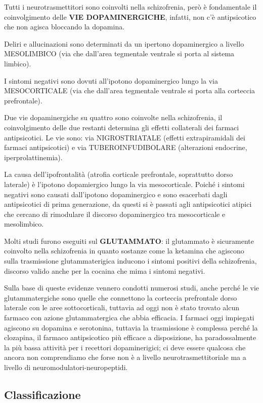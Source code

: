 Tutti i neurotrasmettitori sono coinvolti nella schizofrenia, però è
fondamentale il coinvolgimento delle \textbf{VIE DOPAMINERGICHE},
infatti, non c'è antipsicotico che non agisca bloccando la dopamina.

Deliri e allucinazioni sono determinati da un ipertono dopaminergico a
livello MESOLIMBICO (via che dall'area tegmentale ventrale si porta al
sistema limbico).

I sintomi negativi sono dovuti all'ipotono dopaminergico lungo la via
MESOCORTICALE (via che dall'area tegmentale ventrale si porta alla
corteccia prefrontale).

Due vie dopaminergiche su quattro sono coinvolte nella schizofrenia, il
coinvolgimento delle due restanti determina gli effetti collaterali dei
farmaci antipsicotici. Le vie sono: via NIGROSTRIATALE (effetti
extrapiramidali dei farmaci antipsicotici) e via TUBEROINFUDIBOLARE
(alterazioni endocrine, iperprolattinemia).

La causa dell'ipofrontalità (atrofia corticale prefrontale, soprattutto
dorso laterale) è l'ipotono dopamiergico lungo la via mesocorticale.
Poiché i sintomi negativi sono causati dall'ipotono dopaminergico e sono
esacerbati dagli antipsicotici di prima generazione, da questi si è
passati agli antipsicotici atipici che cercano di rimodulare il discorso
dopaminergico tra mesocorticale e mesolimbico.

Molti studi furono eseguiti sul \textbf{GLUTAMMATO}: il glutammato è
sicuramente coinvolto nella schizofrenia in quanto sostanze come la
ketamina che agiscono sulla trasmissione glutammaterigica inducono i
sintomi positivi della schizofrenia, discorso valido anche per la
cocaina che mima i sintomi negativi.

Sulla base di queste evidenze vennero condotti numerosi studi, anche
perché le vie glutammatergiche sono quelle che connettono la corteccia
prefrontale dorso laterale con le aree sottocorticali, tuttavia ad oggi
non è stato trovato alcun farmaco con azione glutammatergica che abbia
efficacia. I farmaci oggi impiegati agiscono su dopamina e serotonina,
tuttavia la trasmissione è complessa perché la clozapina, il farmaco
antipsicotico più efficace a disposizione, ha paradossalmente la più
bassa attività per i recettori dopaminerigici; ci deve essere qualcosa
che ancora non comprendiamo che forse non è a livello
neurotrasmettitoriale ma a livello di neuromodulatori-neuropeptidi.

\subsection{Classificazione}


